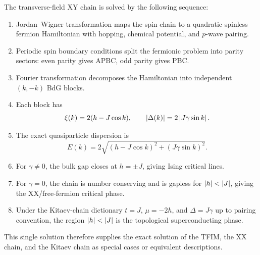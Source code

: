 The transverse-field XY chain is solved by the following sequence:
\begin{enumerate}[label=(\roman*)]
    \item Jordan--Wigner transformation maps the spin chain to a quadratic
    spinless fermion Hamiltonian with hopping, chemical potential, and $p$-wave
    pairing.
    \item Periodic spin boundary conditions split the fermionic problem into
    parity sectors: even parity gives APBC, odd parity gives PBC.
    \item Fourier transformation decomposes the Hamiltonian into independent
    $(k,-k)$ BdG blocks.
    \item Each block has
    \begin{equation}
        \xi(k)=2(h-J\cos k),
        \qquad
        \left|\Delta(k)\right|=2\left|J\gamma\sin k\right|.
    \end{equation}
    \item The exact quasiparticle dispersion is
    \begin{equation}
        E(k)=2\sqrt{(h-J\cos k)^2+(J\gamma\sin k)^2}.
    \end{equation}
    \item For $\gamma\neq0$, the bulk gap closes at $h=\pm J$, giving Ising
    critical lines.
    \item For $\gamma=0$, the chain is number conserving and is gapless for
    $\left|h\right|<\left|J\right|$, giving the XX/free-fermion critical phase.
    \item Under the Kitaev-chain dictionary $t=J$, $\mu=-2h$, and
    $\Delta=J\gamma$ up to pairing convention, the region $\left|h\right|<\left|J\right|$ is
    the topological superconducting phase.
\end{enumerate}

This single solution therefore supplies the exact solution of the TFIM, the XX
chain, and the Kitaev chain as special cases or equivalent descriptions.
